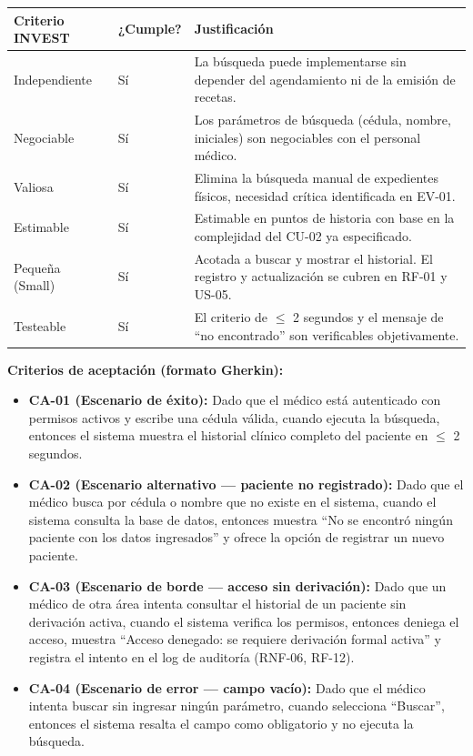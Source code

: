 \documentclass[11pt,a4paper]{article}
\providecommand{\tightlist}{%
	\setlength{\itemsep}{0pt}\setlength{\parskip}{0pt}}
\begin{document}
	\begin{longtable}{p{} p{} p{}}
		
		
		\toprule
		\textbf{Criterio INVEST} &
		\textbf{¿Cumple?} &
		\textbf{Justificación} \\
		\midrule
		\endhead
		
		Independiente & Sí & La búsqueda puede implementarse sin depender del agendamiento ni de la emisión de recetas. \\
		Negociable & Sí & Los parámetros de búsqueda (cédula, nombre, iniciales) son negociables con el personal médico. \\
		Valiosa & Sí & Elimina la búsqueda manual de expedientes físicos, necesidad crítica identificada en EV-01. \\
		Estimable & Sí & Estimable en puntos de historia con base en la complejidad del CU-02 ya especificado. \\
		Pequeña (Small) & Sí & Acotada a buscar y mostrar el historial. El registro y actualización se cubren en RF-01 y US-05. \\
		Testeable & Sí & El criterio de \(\leq\) 2 segundos y el mensaje de ``no encontrado'' son verificables objetivamente. \\
		\bottomrule
		
	\end{longtable}
	
	\textbf{Criterios de aceptación (formato Gherkin):}
	
	\begin{itemize}
		\tightlist
		\item
		\textbf{CA-01 (Escenario de éxito):} Dado que el médico está autenticado con permisos activos y escribe una cédula válida, cuando ejecuta la búsqueda, entonces el sistema muestra el historial clínico completo del paciente en \(\leq\) 2 segundos.
		\item
		\textbf{CA-02 (Escenario alternativo --- paciente no registrado):} Dado que el médico busca por cédula o nombre que no existe en el sistema, cuando el sistema consulta la base de datos, entonces muestra ``No se encontró ningún paciente con los datos ingresados'' y ofrece la opción de registrar un nuevo paciente.
		\item
		\textbf{CA-03 (Escenario de borde --- acceso sin derivación):} Dado que un médico de otra área intenta consultar el historial de un paciente sin derivación activa, cuando el sistema verifica los permisos, entonces deniega el acceso, muestra ``Acceso denegado: se requiere derivación formal activa'' y registra el intento en el log de auditoría (RNF-06, RF-12).
		\item
		\textbf{CA-04 (Escenario de error --- campo vacío):} Dado que el médico intenta buscar sin ingresar ningún parámetro, cuando selecciona ``Buscar'', entonces el sistema resalta el campo como obligatorio y no ejecuta la búsqueda.
	\end{itemize}
	
\end{document}
